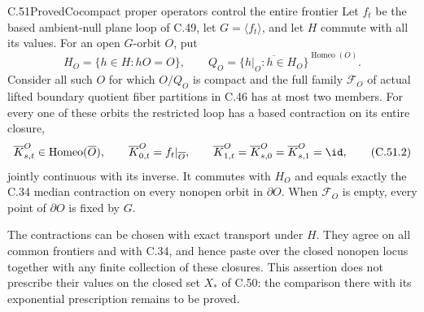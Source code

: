 \begin{claim}{C.51}{Proved}{Cocompact proper operators control the entire frontier}
Let $f_t$ be the based ambient-null plane loop of C.49,
let $G=\langle f_t\rangle$, and let $H$ commute with all
its values. For an open $G$-orbit $O$, put
\[
 H_O=\{h\in H:hO=O\},\qquad
 Q_O=\overline{\{h|_O:h\in H_O\}}^{\operatorname{Homeo}(O)}.
                                                        \tag{C.51.1}
\]
Consider all such $O$ for which $O/Q_O$ is compact and
the full family $\mathscr F_O$ of actual lifted boundary
quotient fiber partitions in C.46 has at most two members.
For every one of these orbits the restricted loop has
a based contraction on its entire closure,
\[
 \overline K^O_{s,t}\in\operatorname{Homeo}(\overline O),
 \qquad
 \overline K^O_{0,t}=f_t|_{\overline O},\qquad
 \overline K^O_{1,t}=\overline K^O_{s,0}
                         =\overline K^O_{s,1}=\id,
                                                        \tag{C.51.2}
\]
jointly continuous with its inverse. It commutes with
$H_O$ and equals exactly the C.34 median contraction
on every nonopen orbit in $\partial O$.
When $\mathscr F_O$ is empty, every point of
$\partial O$ is fixed by $G$.

The contractions can be chosen with exact transport
under $H$. They agree on all common frontiers and with
C.34, and hence paste over the closed nonopen locus
together with any finite collection of these closures.
This assertion does not prescribe their values on the
closed set $X_*$ of C.50: the comparison there with
its exponential prescription remains to be proved.
\end{claim}

